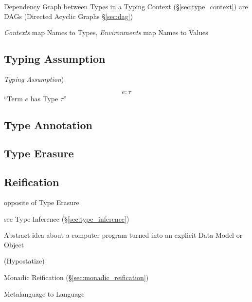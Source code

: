 Dependency Graph between Types in a Typing Context (\S\ref{sec:type_context})
are DAGs (Directed Acyclic Graphs \S\ref{sec:dag})

\emph{Contexts} map Names to Types, \emph{Environments} map Names to Values



\subsection{Typing Assumption}\label{sec:typing_assumption}

\emph{Typing Assumption})

\[
  e : \tau
\]
``Term $e$ has Type $\tau$''



\subsection{Type Annotation}\label{sec:type_annotation}

\subsection{Type Erasure}\label{sec:type_erasure}

\subsection{Reification}\label{sec:reification}

opposite of Type Erasure

see Type Inference (\S\ref{sec:type_inference})

Abstract idea about a computer program turned into an explicit Data
Model or Object

(Hypostatize) %

Monadic Reification (\S\ref{sec:monadic_reification})

Metalanguage to Language

